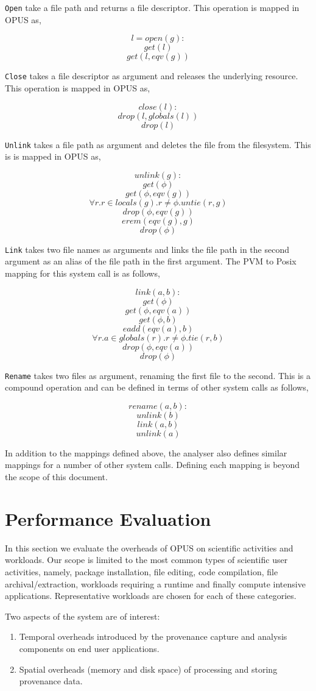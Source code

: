 \documentclass[withindex,glossary]{cam-thesis}
\begin{document}
\texttt{Open} take a file path and returns a file descriptor.
This operation is mapped in OPUS as,

$$l = open(g):$$
$$get(l)$$
$$get(l, eqv(g))$$

\texttt{Close} takes a file descriptor as argument and releases the underlying resource.
This operation is mapped in OPUS as,

$$close(l):$$
$$drop(l, globals(l))$$
$$drop(l)$$

\texttt{Unlink} takes a file path as argument and deletes the file from the filesystem.
This is is mapped in OPUS as,

$$unlink(g):$$
$$get(\phi)$$
$$get(\phi,eqv(g))$$
$$\forall r.r \in locals(g).r\neq\phi.untie(r,g)$$
$$drop(\phi,eqv(g))$$
$$erem(eqv(g),g)$$
$$drop(\phi)$$

\texttt{Link} takes two file names as arguments and links the file path in the second argument as an alias of the file path in the first argument.
The PVM to Posix mapping for this system call is as follows,

$$link(a,b):$$
$$get(\phi)$$
$$get(\phi,eqv(a))$$
$$get(\phi,b)$$
$$eadd(eqv(a),b)$$
$$\forall r.a \in globals(r).r\neq\phi.tie(r,b)$$
$$drop(\phi,eqv(a))$$
$$drop(\phi)$$

\texttt{Rename} takes two files as argument, renaming the first file to the second.
This is a compound operation and can be defined in terms of other system calls as follows,

$$rename(a,b):$$
$$unlink(b)$$
$$link(a,b)$$
$$unlink(a)$$

In addition to the mappings defined above, the analyser also defines similar mappings for a number of other system calls.
Defining each mapping is beyond the scope of this document.

\section{Performance Evaluation}
In this section we evaluate the overheads of OPUS on scientific activities and workloads.
Our scope is limited to the most common types of scientific user activities, namely, 
package installation, file editing, code compilation, file archival/extraction, workloads requiring a runtime and finally compute intensive applications.
Representative workloads are chosen for each of these categories.

Two aspects of the system are of interest:
\begin{enumerate}
\item Temporal overheads introduced by the provenance capture and analysis components on end user applications.
\item Spatial overheads (memory and disk space) of processing and storing provenance data.
\end{enumerate}
\end{document}
